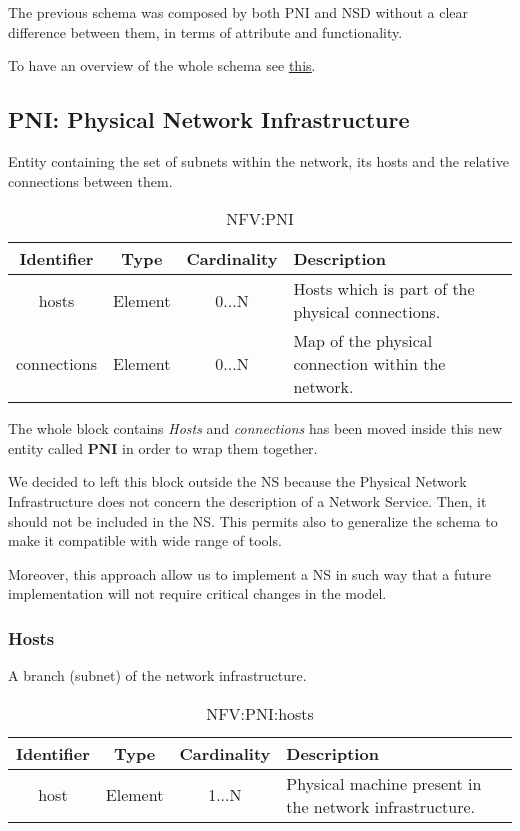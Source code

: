 \documentclass[11pt, english]{article}
\begin{document}
The previous schema was composed by both PNI and NSD without a clear difference between them, in terms of attribute and functionality. 

To have an overview of the whole schema see \href{https://raw.githubusercontent.com/netgroup-polito/nfv-data-model/master/data-format/doc/NFV_model_final.png?token=AYIltFsv8LRFrn_5Q9PjAYBe2HxRzoBFks5ci87twA\%3D\%3D}{\underline{this}}.

\subsection{PNI: Physical Network Infrastructure}
Entity containing the set of subnets within the network, its hosts and the relative connections between them.

\begin{table}[ht]
    \centering
    \begin{tabular}{c|c|c|m{7cm}}
    \hline
    Identifier & Type & Cardinality & Description \\
    \hline
    \rowcolor{Gray}
    hosts & Element & 0...N & Hosts which is part of the physical connections. \\
    \hline
    connections & Element & 0...N & Map of the physical connection within the network. \\
    \hline
    \end{tabular}
    \caption{NFV:PNI} \label{tab:tab2}
\end{table}

The whole block contains \emph{Hosts} and \emph{connections} has been moved inside this new entity called \textbf{PNI} in order to wrap them together.  

We decided to left this block outside the NS because the Physical Network Infrastructure does not concern the description of a Network Service. Then, it should not be included in the NS. This permits also to generalize the schema to make it compatible with wide range of tools.

Moreover, this approach allow us to implement a NS in such way that a future implementation will not require critical changes in the model.

\subsubsection{Hosts}
A branch (subnet) of the network infrastructure. 

\begin{table}[ht]
    \centering
    \begin{tabular}{c|c|c|m{7cm}}
    \hline
    Identifier & Type & Cardinality & Description \\
    \hline
    \rowcolor{Gray}
    host & Element & 1...N & Physical machine present in the network infrastructure. \\
    \hline
    \end{tabular}
    \caption{NFV:PNI:hosts} \label{tab:tab3}
\end{table}
\end{document}
